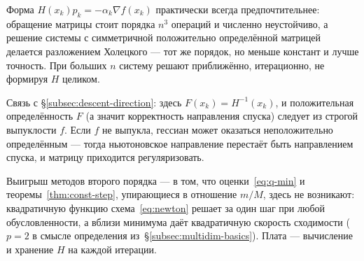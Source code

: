 \begin{idea}
Форма $H(x_k)p_k = -\alpha_k \nabla f(x_k)$ практически всегда предпочтительнее:
обращение матрицы стоит порядка $n^3$ операций и численно неустойчиво, а решение
системы с симметричной положительно определённой матрицей делается разложением
Холецкого — тот же порядок, но меньше констант и лучше точность. При больших $n$
систему решают приближённо, итерационно, не формируя $H$ целиком.

Связь с \S\ref{subsec:descent-direction}: здесь $F(x_k) = H^{-1}(x_k)$, и
положительная определённость $F$ (а значит корректность направления спуска)
следует из строгой выпуклости $f$. Если $f$ не выпукла, гессиан может оказаться
неположительно определённым — тогда ньютоновское направление перестаёт быть
направлением спуска, и матрицу приходится регуляризовать.

Выигрыш методов второго порядка — в том, что оценки~\eqref{eq:q-min} и
теоремы~\ref{thm:const-step}, упирающиеся в отношение $m/M$, здесь не возникают:
квадратичную функцию схема~\eqref{eq:newton} решает за один шаг при любой
обусловленности, а вблизи минимума даёт квадратичную скорость сходимости
($p = 2$ в смысле определения из~\S\ref{subsec:multidim-basics}). Плата —
вычисление и хранение $H$ на каждой итерации.
\end{idea}
